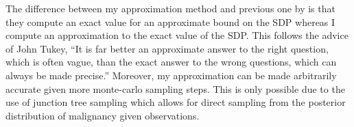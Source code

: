 The difference between my approximation method and previous one by  is that they compute an exact value for an approximate bound on the SDP whereas I compute an approximation to the exact value of the SDP. This follows the advice of John Tukey, ``It is far better an approximate answer to the right question, which is often vague, than the exact answer to the wrong questions, which can always be made precise.'' \cite{Tukey:1962vw} Moreover, my approximation can be made arbitrarily accurate given more monte-carlo sampling steps. This is only possible due to the use of junction tree sampling which allows for direct sampling from the posterior distribution of malignancy given observations. 
